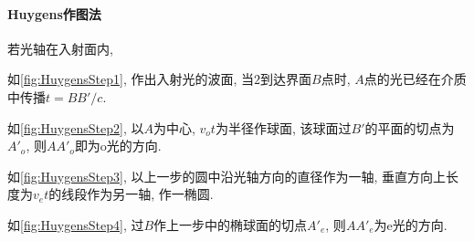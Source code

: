 \documentclass{ctexart}
\begin{document}
\paragraph{Huygens作图法} %
\label{par:huygens作图法}

若光轴在入射面内,
\begin{cenum}
    \item 如\cref{fig:HuygensStep1}, 作出入射光的波面, 当$2$到达界面$B$点时, $A$点的光已经在介质中传播$t = BB'/c$.
    \item 如\cref{fig:HuygensStep2}, 以$A$为中心, $v_ot$为半径作球面, 该球面过$B'$的平面的切点为$A'_o$, 则$AA'_o$即为o光的方向.
    \item 如\cref{fig:HuygensStep3}, 以上一步的圆中沿光轴方向的直径作为一轴, 垂直方向上长度为$v_et$的线段作为另一轴, 作一椭圆.
    \item 如\cref{fig:HuygensStep4}, 过$B$作上一步中的椭球面的切点$A'_e$, 则$AA'_e$为e光的方向.
\end{cenum}

\end{document}
